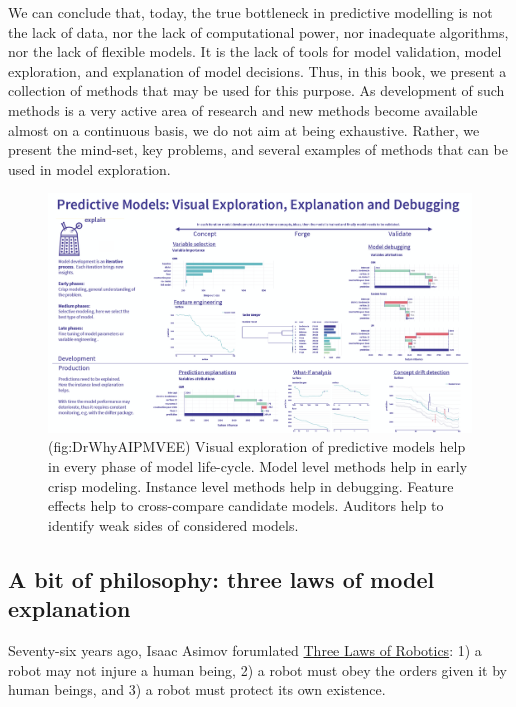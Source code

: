 \documentclass[12pt,]{krantz}
\begin{document}
We can conclude that, today, the true bottleneck in predictive modelling is not the lack of data, nor the lack of computational power, nor inadequate algorithms, nor the lack of flexible models. It is the lack of tools for model validation, model exploration, and explanation of model decisions. Thus, in this book, we present a collection of methods that may be used for this purpose. As development of such methods is a very active area of research and new methods become available almost on a continuous basis, we do not aim at being exhaustive. Rather, we present the mind-set, key problems, and several examples of methods that can be used in model exploration.

\begin{figure}

{\centering \includegraphics[width=0.99\linewidth]{figure/DrWhyAI_PMVEE} 

}

\caption{(fig:DrWhyAIPMVEE) Visual exploration of predictive models help in every phase of model life-cycle. Model level methods help in early crisp modeling. Instance level methods help in debugging. Feature effects help to cross-compare candidate models. Auditors help to identify weak sides of considered models.}\label{fig:DrWhyAIPMVEE}
\end{figure}

\hypertarget{three-single-laws}{%
\subsection{A bit of philosophy: three laws of model explanation}\label{three-single-laws}}

Seventy-six years ago, Isaac Asimov forumlated \href{https://en.wikipedia.org/wiki/Three_Laws_of_Robotics}{Three Laws of Robotics}:
1) a robot may not injure a human being,
2) a robot must obey the orders given it by human beings, and
3) a robot must protect its own existence.
\end{document}
